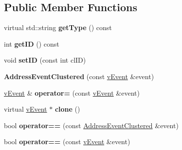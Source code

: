 \subsection*{Public Member Functions}
\begin{DoxyCompactItemize}
\item 
virtual std\+::string {\bfseries get\+Type} () const \hypertarget{classev_1_1AddressEventClustered_aa94f717e6d057e1bf93514ef911bb816}{}\label{classev_1_1AddressEventClustered_aa94f717e6d057e1bf93514ef911bb816}

\item 
int {\bfseries get\+ID} () const \hypertarget{classev_1_1AddressEventClustered_ae67f94b17532d279fe699ce32467d4f3}{}\label{classev_1_1AddressEventClustered_ae67f94b17532d279fe699ce32467d4f3}

\item 
void {\bfseries set\+ID} (const int cl\+ID)\hypertarget{classev_1_1AddressEventClustered_a734fa9597de71f237643bf1e7266f076}{}\label{classev_1_1AddressEventClustered_a734fa9597de71f237643bf1e7266f076}

\item 
{\bfseries Address\+Event\+Clustered} (const \hyperlink{classev_1_1vEvent}{v\+Event} \&event)\hypertarget{classev_1_1AddressEventClustered_a5c446f825d7e0de01b7f55567701b3c8}{}\label{classev_1_1AddressEventClustered_a5c446f825d7e0de01b7f55567701b3c8}

\item 
\hyperlink{classev_1_1vEvent}{v\+Event} \& {\bfseries operator=} (const \hyperlink{classev_1_1vEvent}{v\+Event} \&event)\hypertarget{classev_1_1AddressEventClustered_a095a3e7d00b4399d5f3067d65a573c17}{}\label{classev_1_1AddressEventClustered_a095a3e7d00b4399d5f3067d65a573c17}

\item 
virtual \hyperlink{classev_1_1vEvent}{v\+Event} $\ast$ {\bfseries clone} ()\hypertarget{classev_1_1AddressEventClustered_ae8fb9a80718e4e72902f6577c8646c37}{}\label{classev_1_1AddressEventClustered_ae8fb9a80718e4e72902f6577c8646c37}

\item 
bool {\bfseries operator==} (const \hyperlink{classev_1_1AddressEventClustered}{Address\+Event\+Clustered} \&event)\hypertarget{classev_1_1AddressEventClustered_aa2a96b9c4e98bcfb8e1414d3eed41bb4}{}\label{classev_1_1AddressEventClustered_aa2a96b9c4e98bcfb8e1414d3eed41bb4}

\item 
bool {\bfseries operator==} (const \hyperlink{classev_1_1vEvent}{v\+Event} \&event)\hypertarget{classev_1_1AddressEventClustered_a5060e38f6a55b07cbad61d8fe016c0df}{}\label{classev_1_1AddressEventClustered_a5060e38f6a55b07cbad61d8fe016c0df}


\end{DoxyCompactItemize}
